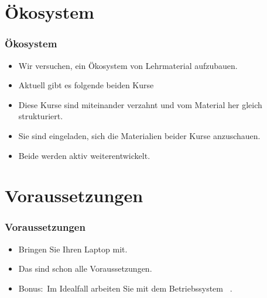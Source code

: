 \documentclass[aspectratio=169,mathserif,notheorems]{beamer}%
\begin{document}
\section{Ökosystem}%
%
\begin{frame}%
\frametitle{Ökosystem}%
\begin{itemize}%
\item Wir versuchen, ein Ökosystem von Lehrmaterial aufzubauen.%
\item<2-> Aktuell gibt es folgende beiden Kurse%
\item<5-> Diese Kurse sind miteinander verzahnt und vom Material her gleich strukturiert.%
\item<6-> Sie sind eingeladen, sich die Materialien beider Kurse anzuschauen.%
\item<7-> Beide werden aktiv weiterentwickelt.%
\end{itemize}%
\end{frame}%
%
%
\section{Voraussetzungen}%
%
\begin{frame}%
\frametitle{Voraussetzungen}%
\begin{itemize}%
\item Bringen Sie Ihren Laptop mit.%
\item<7-> Das sind schon alle Voraussetzungen.%
\item<8-> Bonus:~Im Idealfall arbeiten Sie mit dem Betriebssystem \ubuntu\ \linux\cite{CN2020ULB,H2020ULU2E}.%
\end{itemize}%
\end{frame}%
%
\end{document}
